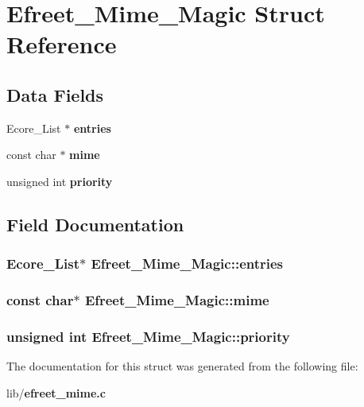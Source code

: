 \section{Efreet\_\-Mime\_\-Magic Struct Reference}
\label{structEfreet__Mime__Magic}
\subsection*{Data Fields}
\begin{CompactItemize}
\item 
Ecore\_\-List $\ast$ {\bf entries}
\item 
const char $\ast$ {\bf mime}
\item 
unsigned int {\bf priority}
\end{CompactItemize}


\subsection{Field Documentation}
\subsubsection[entries]{\setlength{\rightskip}{0pt plus 5cm}Ecore\_\-List$\ast$ {\bf Efreet\_\-Mime\_\-Magic::entries}}\label{structEfreet__Mime__Magic_2c7c0956c1cba9e61497825bc186cd99}


\subsubsection[mime]{\setlength{\rightskip}{0pt plus 5cm}const char$\ast$ {\bf Efreet\_\-Mime\_\-Magic::mime}}\label{structEfreet__Mime__Magic_33981d2c0c90ac176cbf6521f015a7cd}


\subsubsection[priority]{\setlength{\rightskip}{0pt plus 5cm}unsigned int {\bf Efreet\_\-Mime\_\-Magic::priority}}\label{structEfreet__Mime__Magic_518e48b9f4b1761609a3fa8bc0b5b43e}




The documentation for this struct was generated from the following file:\begin{CompactItemize}
\item 
lib/{\bf efreet\_\-mime.c}\end{CompactItemize}
